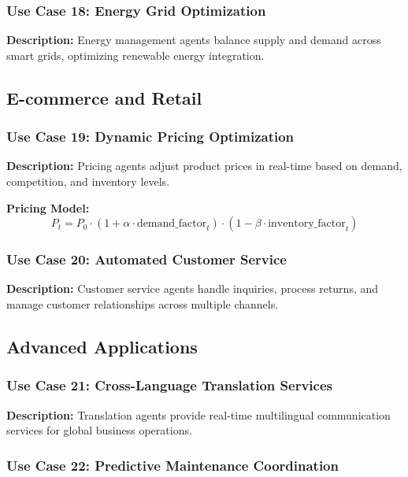 \documentclass[12pt,a4paper]{article}
\begin{document}
\subsubsection{Use Case 18: Energy Grid Optimization}

\textbf{Description:} Energy management agents balance supply and demand across smart grids, optimizing renewable energy integration.

\subsection{E-commerce and Retail}

\subsubsection{Use Case 19: Dynamic Pricing Optimization}

\textbf{Description:} Pricing agents adjust product prices in real-time based on demand, competition, and inventory levels.

\textbf{Pricing Model:}
$$P_t = P_0 \cdot (1 + \alpha \cdot \text{demand\_factor}_t) \cdot (1 - \beta \cdot \text{inventory\_factor}_t)$$

\subsubsection{Use Case 20: Automated Customer Service}

\textbf{Description:} Customer service agents handle inquiries, process returns, and manage customer relationships across multiple channels.

\subsection{Advanced Applications}

\subsubsection{Use Case 21: Cross-Language Translation Services}

\textbf{Description:} Translation agents provide real-time multilingual communication services for global business operations.

\subsubsection{Use Case 22: Predictive Maintenance Coordination}
\end{document}
